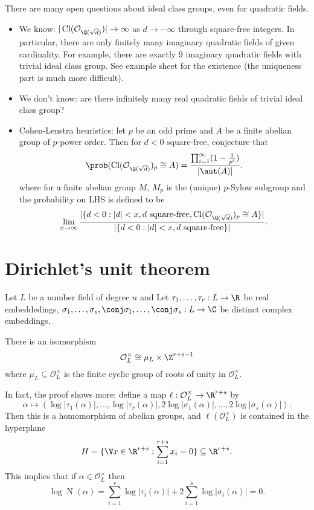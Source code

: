 \documentclass[a4paper]{article}
\renewcommand*{\O}{\mathcal{O}}
\DeclareMathOperator{\n}{N}
\DeclareMathOperator{\Cl}{Cl} %
\begin{document}
\begin{remark}
  There are many open questions about ideal class groups, even for quadratic fields.
  \begin{itemize}
  \item We know: \(|\Cl(\O_{\Q(\sqrt d)})| \to \infty\) as \(d \to -\infty\) through square-free integers. In particular, there are only finitely many imaginary quadratic fields of given cardinality. For example, there are exactly \(9\) imaginary quadratic fields with trivial ideal class group. See example sheet for the existence (the uniqueness part is much more difficult).
  \item We don't know: are there infinitely many real quadratic fields of trivial ideal class group?
  \item Cohen-Lenstra heuristics: let \(p\) be an odd prime and \(A\) be a finite abelian group of \(p\)-power order. Then for \(d < 0\) square-free, conjecture that
    \[
      \prob(\Cl(\O_{\Q(\sqrt d)})_p \cong A) = \frac{\prod_{i = 1}^\infty (1 - \frac{1}{p^i})}{|\aut(A)|}.
      \]
      where for a finite abelian group \(M\), \(M_p\) is the (unique) \(p\)-Sylow subgroup and the probability on LHS is defined to be
      \[
        \lim_{x \to \infty} \frac{|\{ d < 0: |d| < x, d \text{ square-free}, \Cl(\O_{\Q(\sqrt d)})_p \cong A \}|}{|\{ d < 0: |d| < x, d \text{ square-free} \}|}.
      \]
  \end{itemize}
\end{remark}

\section{Dirichlet's unit theorem}

Let \(L\) be a number field of degree \(n\) and Let \(\tau_1, \dots, \tau_r: L \to \R\) be real embeddedings, \(\sigma_1, \dots, \sigma_s, \conj \sigma_1, \dots, \conj \sigma_s: L \to \C\) be distinct complex embeddings.

\begin{theorem}
  \label{thm:Dirichlet unit}
  There is an isomorphism
  \[
    \O_L^\times \cong \mu_L \times \Z^{r + s - 1}
  \]
  where \(\mu_L \subseteq \O_L^\times\) is the finite cyclic group of roots of unity in \(\O_L^\times\).
\end{theorem}

In fact, the proof shows more: define a map \(\ell: \O_L^\times \to \R^{r + s}\) by
\[
  \alpha \mapsto (\log |\tau_1(\alpha)|, \dots, \log |\tau_r(\alpha)|, 2\log |\sigma_1(\alpha)|, \dots, 2\log |\sigma_s(\alpha)|).
\]
Then this is a homomorphism of abelian groups, and \(\ell(\O_L^\times)\) is contained in the hyperplane
\[
  H = \{ \V x \in \R^{r + s}: \sum_{i = 1}^{r + s} x_i = 0\} \subseteq \R^{r + s}.
\]
This implies that if \(\alpha \in \O_L^\times\) then
\[
  \log \n(\alpha) = \sum_{i = 1}^r \log |\tau_i(\alpha)| + 2 \sum_{i = 1}^s \log |\sigma_i(\alpha)| = 0.
\]
\end{document}
